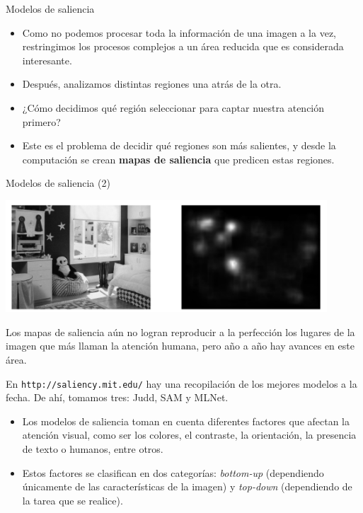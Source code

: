 \documentclass[compress]{beamer}
\begin{document}
\begin{frame}{Modelos de saliencia}

\begin{itemize}
\item Como no podemos procesar toda la información de una imagen a la vez, restringimos los procesos complejos a un área reducida que es considerada interesante. 
\item Después, analizamos distintas regiones una atrás de la otra. 
\item ¿Cómo decidimos qué región seleccionar para captar nuestra atención primero?
\item Este es el problema de decidir qué regiones son más salientes, y desde la computación se crean \textbf{mapas de saliencia} que predicen estas regiones.
\end{itemize}

\end{frame}

\begin{frame}{Modelos de saliencia (2)}
\begin{center}
\includegraphics[width=0.9\textwidth]{images/ejemplo-mlnet.png}
\end{center}

{\small Los mapas de saliencia aún no logran reproducir a la perfección los lugares de la imagen que más llaman la atención humana, pero año a año hay avances en este área.\\}

\bigskip

{\small En \texttt{http://saliency.mit.edu/} hay una recopilación de los mejores modelos a la fecha. De ahí, tomamos tres: Judd, SAM y MLNet.}

\end{frame}

\begin{frame}
\begin{itemize}
\item Los modelos de saliencia toman en cuenta diferentes factores que afectan la atención visual, como ser los colores, el contraste, la orientación, la presencia de texto o humanos, entre otros.
\item Estos factores se clasifican en dos categorías: \textit{bottom-up} (dependiendo únicamente de las características de la imagen) y \textit{top-down} (dependiendo de la tarea que se realice).
\end{itemize}
\end{frame}
\end{document}
